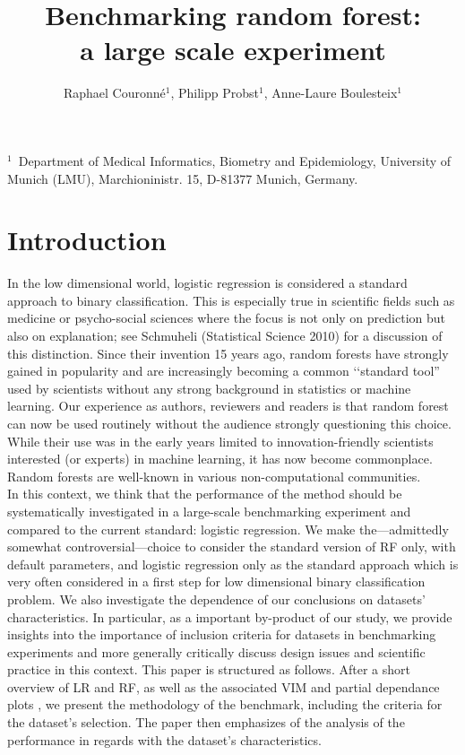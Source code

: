 \documentclass[12pt]{article}
\title{Benchmarking random forest:\\ a large scale experiment}
\author{Raphael Couronn\'e$^1$, Philipp Probst$^1$, Anne-Laure Boulesteix$^1$}
\date{}
\begin{document}

\maketitle

\noindent
$^1$\ Department of Medical Informatics, Biometry and Epidemiology, University of Munich (LMU), Marchioninistr. 15, D-81377 Munich, Germany.


\begin{abstract}

\end{abstract}


\newpage
\section{Introduction}

In the low dimensional world, logistic regression is considered a standard approach to binary classification. This is especially true in scientific fields such as medicine or psycho-social sciences where the focus is not only on prediction but also on explanation; see Schmuheli (Statistical Science 2010) for a discussion of this distinction. Since their invention 15 years ago, random forests \cite{breiman2001random} have strongly gained in popularity and are increasingly becoming a common \lq\lq standard tool'' used by scientists without any strong background in statistics or machine learning. Our experience as authors, reviewers and readers is that random forest can now be used routinely without the audience strongly questioning this choice. While their use was in the early years limited to innovation-friendly scientists interested (or experts) in machine learning, it has now become commonplace. Random forests are well-known in various non-computational communities. \\
In this context, we think that the performance of the method should be systematically investigated in a large-scale benchmarking experiment and compared to the current standard: logistic regression. We make the---admittedly somewhat controversial---choice to consider the standard version of RF only, with default parameters, and logistic regression only as the standard approach which is very often considered in a first step for low dimensional binary classification problem.
We also investigate the dependence of our conclusions on datasets' characteristics. In particular, as a important by-product of our study, we provide insights into the importance of inclusion criteria for datasets in benchmarking experiments and more generally critically discuss design issues and scientific practice in this context.
This paper is structured as follows. After a short overview of LR and RF, as well as the associated VIM and partial dependance plots \cite{friedman2001greedy}, we present the methodology of the benchmark, including the criteria for the dataset's selection. The paper then emphasizes of the analysis of the performance in regards with the dataset's characteristics.
\end{document}
